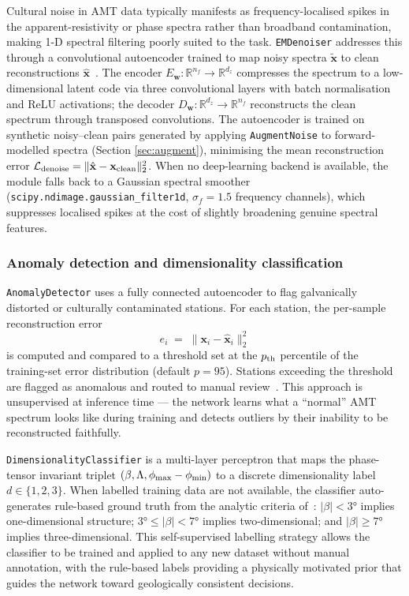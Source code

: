 \documentclass[review,12pt]{elsarticle}
\begin{document}
Cultural noise in AMT data typically manifests as frequency-localised spikes
in the apparent-resistivity or phase spectra rather than broadband
contamination, making 1-D spectral filtering poorly suited to the task.
\texttt{EMDenoiser} addresses this through a convolutional autoencoder
trained to map noisy spectra $\tilde{\mathbf{x}}$ to clean reconstructions
$\hat{\mathbf{x}}$~\citep{Oh2019,Liu2021}.
The encoder $E_{\bm{w}}:\mathbb{R}^{n_f}\to\mathbb{R}^{d_z}$ compresses
the spectrum to a low-dimensional latent code via three convolutional
layers with batch normalisation and ReLU activations; the decoder
$D_{\bm{w}}:\mathbb{R}^{d_z}\to\mathbb{R}^{n_f}$ reconstructs the clean
spectrum through transposed convolutions.
The autoencoder is trained on synthetic noisy–clean pairs generated by
applying \texttt{AugmentNoise} to forward-modelled spectra (Section
\ref{sec:augment}), minimising the mean reconstruction error
$\mathcal{L}_{\rm denoise} = \|\hat{\mathbf{x}}-\mathbf{x}_{\rm clean}\|_2^2$.
When no deep-learning backend is available, the module falls back to a
Gaussian spectral smoother (\texttt{scipy.ndimage.gaussian\_filter1d},
$\sigma_f = 1.5$ frequency channels), which suppresses localised spikes at
the cost of slightly broadening genuine spectral features.

\subsubsection{Anomaly detection and dimensionality classification}
\label{sec:dimclass}

\texttt{AnomalyDetector} uses a fully connected autoencoder to flag
galvanically distorted or culturally contaminated stations.
For each station, the per-sample reconstruction error
\begin{equation}
  e_i \;=\; \bigl\|\mathbf{x}_i - \hat{\mathbf{x}}_i\bigr\|_2^2
  \label{eq:reconerr}
\end{equation}
is computed and compared to a threshold set at the
$p_{\rm th}$ percentile of the training-set error distribution
(default $p=95$).
Stations exceeding the threshold are flagged as anomalous and routed to
manual review~\citep{Moghadas2020}.
This approach is unsupervised at inference time — the network learns what a
``normal'' AMT spectrum looks like during training and detects outliers by
their inability to be reconstructed faithfully.

\texttt{DimensionalityClassifier} is a multi-layer perceptron that maps
the phase-tensor invariant triplet $(\beta, \Lambda, \phi_{\rm max}-\phi_{\rm min})$
to a discrete dimensionality label $d\in\{1,2,3\}$.
When labelled training data are not available, the classifier auto-generates
rule-based ground truth from the analytic criteria of~\citet{Caldwell2004}:
$|\beta|<3°$ implies one-dimensional structure; $3°\leq|\beta|<7°$ implies
two-dimensional; and $|\beta|\geq7°$ implies three-dimensional.
This self-supervised labelling strategy allows the classifier to be trained
and applied to any new dataset without manual annotation, with the
rule-based labels providing a physically motivated prior that guides the
network toward geologically consistent decisions.
\end{document}
